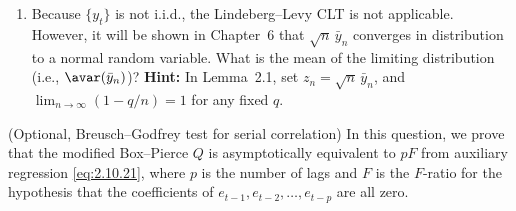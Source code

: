 \begin{problemset}
\begin{enumerate}[label=(\alph*)]
\item Because $\{y_t\}$ is not i.i.d., the Lindeberg--Levy CLT is not applicable.
However, it will be shown in Chapter~6 that $\sqrt{n}\,\bar{y}_n$ converges in distribution
to a normal random variable. What is the mean of the limiting distribution
(i.e., $\avar(\bar{y}_n)$)?
\textbf{Hint:} In Lemma~2.1, set $z_n = \sqrt{n}\,\bar{y}_n$, and
$\lim_{n\to\infty}(1 - q/n) = 1$ for any fixed $q$.
\end{enumerate}

\exercise[11] (Optional, Breusch--Godfrey test for serial correlation)\quad
In this question, we
prove that the modified Box--Pierce $Q$ is asymptotically equivalent to $pF$ from
auxiliary regression \eqref{eq:2.10.21}, where $p$ is the number of lags and $F$ is the $F$-ratio for the hypothesis that the coefficients of $e_{t-1}, e_{t-2}, \ldots, e_{t-p}$ are all zero.


\end{problemset}
